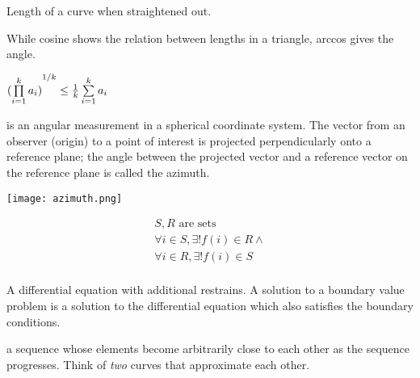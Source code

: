 \begin{definition}
    Length of a curve when straightened out.
\end{definition}
\begin{definition}[arccos]
    While cosine shows the relation between lengths in a triangle, 
    arccos gives the angle.
\end{definition}

\begin{definition}\label{arigeo}
    $
    \newline {(\prod\limits_{i = 1}^{k} a_{i})}^{1/k}
    \leq {1 \over k} \sum\limits_{i = 1}^{k} a_{i}
    $
\end{definition}

\begin{definition}[Azimuth]
     is an angular measurement in a spherical coordinate system. The vector
     from an observer (origin) to a point of interest is projected
     perpendicularly onto a reference plane; the angle between the projected
     vector and a reference vector on the reference plane is called the
     azimuth.

     \texttt{[image: azimuth.png]}

\end{definition}

\begin{definition}[Bijection]
    \begin{align}
        S,R \text{\ are sets} \\
        \forall{i \in S}, \exists!{f(i) \in R} \wedge \\
        \forall{i \in R}, \exists!{f(i) \in S} \\
    \end{align}
\end{definition}

\begin{definition}
    A differential equation with additional restrains. A solution to a boundary
    value problem is a solution to the differential equation which also
    satisfies the boundary conditions.
    
\end{definition}


\begin{definition}
    a sequence whose elements become arbitrarily close to each other as the
    sequence progresses.
    Think of \textit{two} curves that approximate each other.

\end{definition}

